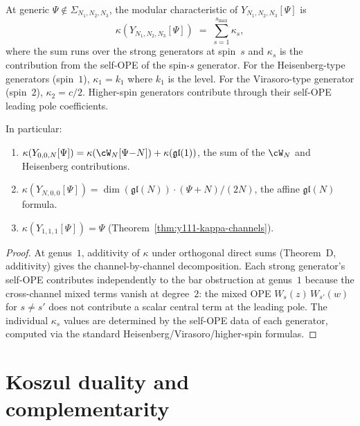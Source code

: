 \begin{theorem}%
\label{thm:y-kappa-general}
At generic $\Psi \notin \Sigma_{N_1,N_2,N_3}$, the modular
characteristic of $Y_{N_1,N_2,N_3}[\Psi]$ is
\begin{equation}\label{eq:y-kappa-general}
\kappa(Y_{N_1,N_2,N_3}[\Psi])
\;=\;
\sum_{s=1}^{s_{\max}} \kappa_s,
\end{equation}
where the sum runs over the strong generators at spin~$s$
and $\kappa_s$ is the contribution from the self-OPE of the
spin-$s$ generator. For the Heisenberg-type generators
\textup{(}spin~$1$\textup{)}, $\kappa_1 = k_1$ where $k_1$ is
the level. For the Virasoro-type generator
\textup{(}spin~$2$\textup{)}, $\kappa_2 = c/2$. Higher-spin
generators contribute through their self-OPE leading pole
coefficients.

In particular:
\begin{enumerate}[label=\textup{(\roman*)}]
\item $\kappa(Y_{0,0,N}[\Psi])
 = \kappa(\cW_N[\Psi{-}N]) + \kappa(\mathfrak{gl}(1))$,
 the sum of the $\cW_N$ and Heisenberg contributions.
\item $\kappa(Y_{N,0,0}[\Psi])
 = \dim(\mathfrak{gl}(N))\cdot(\Psi + N)/(2N)$,
 the affine $\mathfrak{gl}(N)$ formula.
\item $\kappa(Y_{1,1,1}[\Psi]) = \Psi$
 \textup{(}Theorem~\textup{\ref{thm:y111-kappa-channels}}\textup{)}.
\end{enumerate}
\end{theorem}

\begin{proof}
At genus~$1$, additivity of $\kappa$ under orthogonal direct
sums (Theorem~D, additivity) gives the channel-by-channel
decomposition. Each strong generator's self-OPE contributes
independently to the bar obstruction at genus~$1$ because the
cross-channel mixed terms vanish at degree~$2$: the mixed OPE
$W_s(z)\,W_{s'}(w)$ for $s \neq s'$ does not contribute a
scalar central term at the leading pole. The individual
$\kappa_s$ values are determined by the self-OPE data of each
generator, computed via the standard Heisenberg/Virasoro/higher-spin
formulas.
\end{proof}


\section{Koszul duality and complementarity}%
\label{sec:y-koszul-duality}

